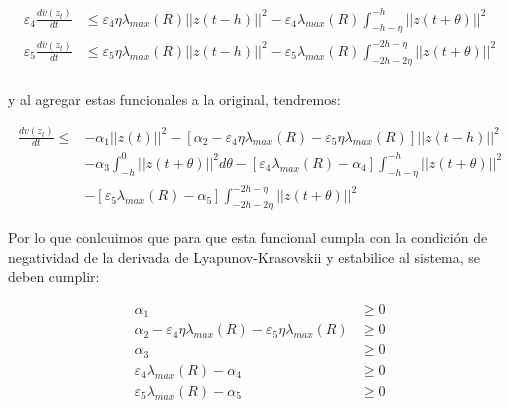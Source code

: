         \begin{align*}
            \varepsilon_4 \frac{d\bar{v}(z_t)}{dt} &\leq \varepsilon_4 \eta \lambda_{max}(R) \left|\left| z(t - h) \right|\right|^2 - \varepsilon_4 \lambda_{max}(R) \int_{-h-\eta}^{-h} \left|\left| z(t + \theta) \right|\right|^2 \\
            \varepsilon_5 \frac{d\bar{v}(z_t)}{dt} &\leq \varepsilon_5 \eta \lambda_{max}(R) \left|\left| z(t - h) \right|\right|^2 - \varepsilon_5 \lambda_{max}(R) \int_{-2h-2\eta}^{-2h-\eta} \left|\left| z(t + \theta) \right|\right|^2 \\
        \end{align*}

        y al agregar estas funcionales a la original, tendremos:

        \begin{align*}
            \frac{d v(z_t)}{dt} \leq& - \alpha_1 \left|\left| z(t) \right|\right|^2 - \left[ \alpha_2 - \varepsilon_4 \eta \lambda_{max}(R) - \varepsilon_5 \eta \lambda_{max}(R) \right] \left|\left| z(t - h) \right|\right|^2 \\
            &- \alpha_3 \int_{-h}^0 \left|\left| z(t + \theta) \right|\right|^2 d\theta
            -\left[ \varepsilon_4 \lambda_{max}(R) - \alpha_4 \right] \int_{-h - \eta}^{-h} \left|\left| z(t + \theta) \right|\right|^2 \\
            &-\left[ \varepsilon_5 \lambda_{max}(R) - \alpha_5 \right] \int_{-2h - 2\eta}^{-2h - \eta} \left|\left| z(t + \theta) \right|\right|^2
        \end{align*}

        Por lo que conlcuimos que para que esta funcional cumpla con la condición de negatividad de la derivada de Lyapunov-Krasovskii y estabilice al sistema, se deben cumplir:

        \begin{align}
            \alpha_1 &\geq 0 \\
            \alpha_2 - \varepsilon_4 \eta \lambda_{max}(R) - \varepsilon_5 \eta \lambda_{max}(R) &\geq 0 \\
            \alpha_3 &\geq 0 \\
            \varepsilon_4 \lambda_{max}(R) - \alpha_4 &\geq 0 \\
            \varepsilon_5 \lambda_{max}(R) - \alpha_5 &\geq 0
        \end{align}

    
    

